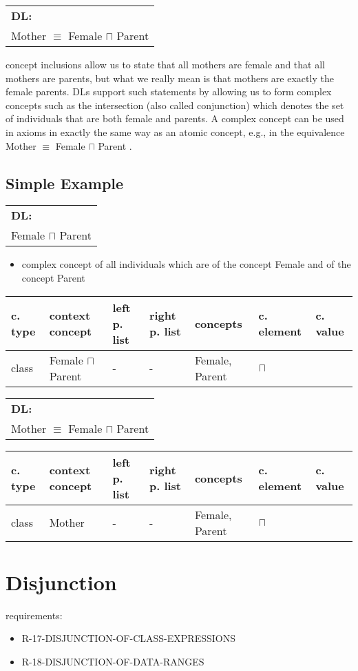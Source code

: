 \documentclass{llncs}
\newenvironment{gcotable}{
  \scriptsize
  \sffamily
  \vspace{0.3cm}
  \begin{tabular}{l|l|l|l|l|l|l}
  \hline
  \textbf{c. type} & \textbf{context concept} & \textbf{left p. list} & \textbf{right p. list} & \textbf{concepts} & \textbf{c. element} & \textbf{c. value} \\
  \hline

}{
  \hline
  \end{tabular}
  \linebreak
}
\newenvironment{DL}{
  \scriptsize
  \sffamily
  \vspace{0.3cm}
  \begin{tabular}{l}
	\textbf{DL:} \\

}{
  \end{tabular}
  \linebreak
}
\begin{document}
\begin{DL}
Mother $\equiv$ Female $\sqcap$ Parent
\end{DL}

concept inclusions allow us to state that all mothers are female and that
all mothers are parents, but what we really mean is that mothers are exactly the female
parents. DLs support such statements by allowing us to form complex concepts such as
the intersection (also called conjunction)
which denotes the set of individuals that are both female and parents. A complex concept
can be used in axioms in exactly the same way as an atomic concept, e.g., in the
equivalence Mother $\equiv$ Female $\sqcap$ Parent .

\subsection{Simple Example}

\begin{DL}
Female $\sqcap$ Parent
\end{DL}

\begin{itemize}
	\item complex concept of all individuals which are of the concept Female and of the concept Parent
\end{itemize}

\begin{gcotable}
class & Female $\sqcap$ Parent & - & - & Female, Parent & $\sqcap$ \\
\end{gcotable}

\begin{DL}
Mother $\equiv$ Female $\sqcap$ Parent
\end{DL}

\begin{gcotable}
class & Mother & - & - & Female, Parent & $\sqcap$ \\
\end{gcotable}

\section{Disjunction}

requirements:

\begin{itemize}
	\item R-17-DISJUNCTION-OF-CLASS-EXPRESSIONS
	\item R-18-DISJUNCTION-OF-DATA-RANGES
\end{itemize}
\end{document}
